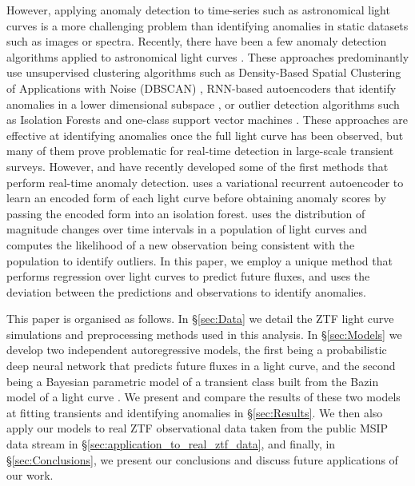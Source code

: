 \documentclass[fleqn,usenatbib]{mnras}
\begin{document}
However, applying anomaly detection to time-series such as astronomical light curves is a more challenging problem than identifying anomalies in static datasets such as images or spectra. Recently, there have been a few anomaly detection algorithms applied to astronomical light curves \citep[e.g.][]{Rebbapragada2009_Timeseries,Nun2014_Timeseries,Solarz2017,Giles2019_Timeseries,Sadeh2019_Timeseries, Pruzhinskaya2019, Soraism2020Novelties, Webb2020,Villar2021_Anomalydetection, MartinezGalarza2020Waldo, Lochner2020Astronomaly,Ishida2021_Timeseries,Malanchev2021}. These approaches predominantly use unsupervised clustering algorithms such as Density-Based Spatial Clustering of Applications with Noise (DBSCAN) \citep[e.g.][]{Giles2019_Timeseries,Webb2020}, RNN-based autoencoders that identify anomalies in a lower dimensional subspace \citep[e.g.][]{Sadeh2019_Timeseries, Villar2021_Anomalydetection}, or outlier detection algorithms such as Isolation Forests \citep[e.g.][]{Pruzhinskaya2019,Ishida2021_Timeseries,Giles2019_Timeseries,Lochner2020Astronomaly, Malanchev2021} and one-class support vector machines \citep[e.g.][]{Solarz2017, Malanchev2021}. These approaches are effective at identifying anomalies once the full light curve has been observed, but many of them prove problematic for real-time detection in large-scale transient surveys. However, \citet{Soraism2020Novelties} and \citet{Villar2021_Anomalydetection} have recently developed some of the first methods that perform real-time anomaly detection. \citet{Villar2021_Anomalydetection} uses a variational recurrent autoencoder to learn an encoded form of each light curve before obtaining anomaly scores by passing the encoded form into an isolation forest. \citet{Soraism2020Novelties} uses the distribution of magnitude changes over time intervals in a population of light curves and computes the likelihood of a new observation being consistent with the population to identify outliers. In this paper, we employ a unique method that performs regression over light curves to predict future fluxes, and uses the deviation between the predictions and observations to identify anomalies. 

This paper is organised as follows. In \S\ref{sec:Data} we detail the ZTF light curve simulations and preprocessing methods used in this analysis. In \S\ref{sec:Models} we develop two independent autoregressive models, the first being a probabilistic deep neural network that predicts future fluxes in a light curve, and the second being a Bayesian parametric model of a transient class built from the Bazin model of a light curve \citep{Bazin_function}. We present and compare the results of these two models at fitting transients and identifying anomalies in \S\ref{sec:Results}. We then also apply our models to real ZTF observational data taken from the public MSIP data stream in \S\ref{sec:application_to_real_ztf_data}, and finally, in \S\ref{sec:Conclusions}, we present our conclusions and discuss future applications of our work. 
\end{document}
